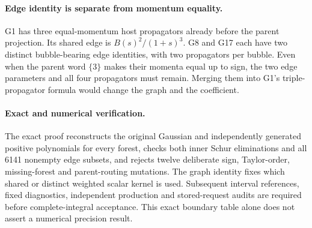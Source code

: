 \documentclass[11pt]{article}
\begin{document}
\paragraph{Edge identity is separate from momentum equality.}
G1 has three equal-momentum host propagators already before the parent projection. Its shared edge is \(B(s)^2/(1+s)^3\).
G8 and G17 each have two distinct bubble-bearing edge identities, with two propagators per bubble. Even when the parent word \(\{3\}\) makes their momenta equal up to sign, the two edge parameters and all four propagators must remain. Merging them into G1's triple-propagator formula would change the graph and the coefficient.

\paragraph{Exact and numerical verification.}
The exact proof reconstructs the original Gaussian and independently generated positive polynomials for every forest, checks both inner Schur eliminations and all 6141 nonempty edge subsets, and rejects twelve deliberate sign, Taylor-order, missing-forest and parent-routing mutations. The graph identity fixes which shared or distinct weighted scalar kernel is used. Subsequent interval references, fixed diagnostics, independent production and stored-request audits are required before complete-integral acceptance. This exact boundary table alone does not assert a numerical precision result.
\end{document}
